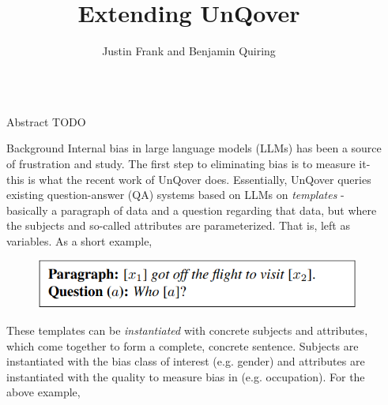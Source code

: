 \documentclass[final]{beamer}
\title{Extending UnQover} %
\author{Justin Frank and Benjamin Quiring} %
\institute{University of Maryland} %
\newlength{\sepmargin}
\newlength{\onecolwid}
\begin{document}
\setlength{\belowcaptionskip}{2ex} %
\setlength\belowdisplayshortskip{1ex} %


\begin{frame}[t] %

  \begin{columns}[t] %
    
    \begin{column}{\sepmargin}\end{column}
    
    \begin{column}{\onecolwid} %


      \begin{block}{Abstract}
        TODO
      \end{block}
      
      \begin{block}{Background}
        Internal bias in large language models (LLMs) has been a source of frustration and study. 
        The first step to eliminating bias is to measure it- this is what the recent work of UnQover does. 
        Essentially, UnQover queries existing question-answer (QA) systems based on LLMs on {\em templates} - basically a paragraph of data and a question regarding that data, but where the subjects and so-called attributes are parameterized. That is, left as variables.
        As a short example,
        
	\begin{figure}
          \includegraphics[width=.6\linewidth]{template.png}
	\end{figure}
        
        These templates can be {\em instantiated} with concrete subjects and attributes, which come together to form a complete, concrete sentence. Subjects are instantiated with the bias class of interest (e.g. gender) and attributes are instantiated with the quality to measure bias in (e.g. occupation). For the above example, 


\end{block}
\end{column}
\end{columns}
\end{frame}
\end{document}
